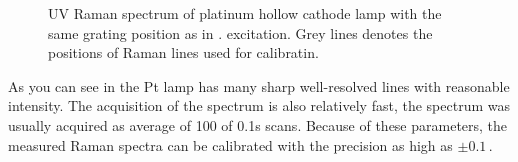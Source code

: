 \begin{figure}
	\centering
	
	\caption{%
		UV Raman spectrum of platinum hollow cathode lamp with the same grating
		position as in
		.
		excitation. Grey lines denotes the positions of Raman lines used for
		calibratin.%
	}
	\label{\figlabel{wavenumber_calibration:pt_spc}}
\end{figure}

As you can see in
the Pt lamp has many sharp well-resolved lines with reasonable intensity. The
acquisition of the spectrum is also relatively fast, the spectrum was usually
acquired as average of 100 of 0.1s scans. Because of these parameters, the
measured Raman spectra can be calibrated with the precision as high as
$\pm0.1$\,\icm.
